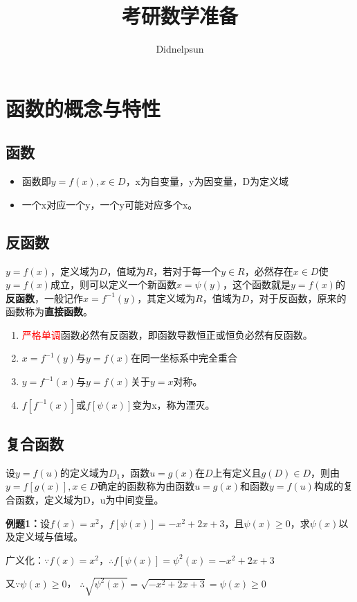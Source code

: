 \documentclass[UTF8, 12pt]{ctexart}
\author{Didnelpsun}
\title{考研数学准备}
\begin{document}
\maketitle
\thispagestyle{empty}
\tableofcontents
\thispagestyle{empty}
\newpage
\pagestyle{plain}
\setcounter{page}{1}
\section{函数的概念与特性}
\subsection{函数}
\begin{itemize}
    \item 函数即$y=f(x),x\in D$，x为自变量，y为因变量，D为定义域
    \item 一个x对应一个y，一个y可能对应多个x。
\end{itemize}
\subsection{反函数}
$y=f(x)$，定义域为$D$，值域为$R$，若对于每一个$y\in R$，必然存在$x\in D$使$y=f(x)$成立，则可以定义一个新函数$x=\psi(y)$，这个函数就是$y=f(x)$的\textbf{反函数}，一般记作$x=f^{-1}(y)$，其定义域为$R$，值域为$D$，对于反函数，原来的函数称为\textbf{直接函数}。
\begin{enumerate}
    \item \textcolor{red}{严格单调}函数必然有反函数，即函数导数恒正或恒负必然有反函数。
    \item $x=f^{-1}(y)$与$y=f(x)$在同一坐标系中完全重合
    \item $y=f^{-1}(x)$与$y=f(x)$关于$y=x$对称。
    \item $f[f^{-1}(x)]$或$f[\psi(x)]$变为x，称为湮灭。
\end{enumerate}
\subsection{复合函数}
设$y=f(u)$的定义域为$D_1$，函数$u=g(x)$在$D$上有定义且$g(D)\in D$，则由$y=f[g(x)],x\in D$确定的函数称为由函数$u=g(x)$和函数$y=f(u)$构成的复合函数，定义域为D，u为中间变量。

\textbf{例题1：}设$f(x)=x^2$，$f[\psi(x)]=-x^2+2x+3$，且$\psi(x)\geqslant 0$，求$\psi(x)$以及定义域与值域。

广义化：$\because f(x)=x^2$，$\therefore f[\psi(x)]=\psi^2(x)=-x^2+2x+3$

又$\because\psi(x)\geqslant 0$， $\therefore\sqrt{\psi^2(x)}=\sqrt{-x^2+2x+3}=\psi(x)\geqslant 0$
\end{document}

